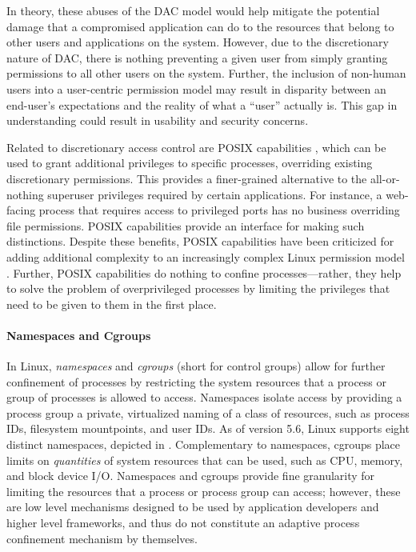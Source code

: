 \documentclass[dvipsnames, 12pt]{article}
\begin{document}
In theory, these abuses of the DAC model would help mitigate the potential
damage that a compromised application can do to the resources that belong to
other users and applications on the system. However, due to the discretionary
nature of DAC, there is nothing preventing a given user from simply granting
permissions to all other users on the system. Further, the inclusion of
non-human users into a user-centric permission model may result in disparity
between an end-user's expectations and the reality of what a \enquote{user}
actually is. This gap in understanding could result in usability and security
concerns.

Related to discretionary access control are POSIX capabilities
\cite{posix_capabilities,corbet2006_capabities_a,corbet2006_capabities_b}, which
can be used to grant additional privileges to specific processes, overriding
existing discretionary permissions. This provides a finer-grained alternative to
the all-or-nothing superuser privileges required by certain applications. For
instance, a web-facing process that requires access to privileged ports has no
business overriding file permissions. POSIX capabilities provide an interface
for making such distinctions. Despite these benefits, POSIX capabilities have
been criticized for adding additional complexity to an increasingly complex
Linux permission model \cite{corbet2006_capabities_b,corbet2006_capabities_a}.
Further, POSIX capabilities do nothing to confine processes---rather, they help
to solve the problem of overprivileged processes by limiting the privileges that
need to be given to them in the first place.

\paragraph*{Namespaces and Cgroups}
In Linux, \textit{namespaces} and \textit{cgroups} (short for control groups)
allow for further confinement of processes by restricting the system resources
that a process or group of processes is allowed to access. Namespaces isolate
access by providing a process group a private, virtualized naming of a class of
resources, such as process IDs, filesystem mountpoints, and user IDs. As of
version 5.6, Linux supports eight distinct namespaces, depicted in
.  Complementary to namespaces, cgroups place limits on
\textit{quantities} of system resources that can be used, such as CPU, memory,
and block device I/O.  Namespaces and cgroups provide fine granularity for
limiting the resources that a process or process group can access; however,
these are low level mechanisms designed to be used by application developers and
higher level frameworks, and thus do not constitute an adaptive process
confinement mechanism by themselves.
\end{document}
